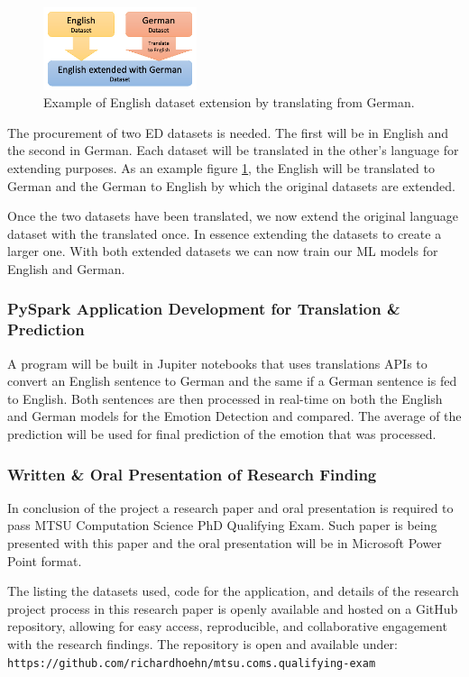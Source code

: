 \documentclass[11pt]{article}
\begin{document}
\begin{figure} %
    \centering
    \includegraphics[width=0.4\textwidth]{Dataset-Extension}
    \caption{Example of English dataset extension by translating from German.}
    \label{fig:dataset-extension}
\end{figure}

The procurement of two ED datasets is needed. The first will be in English and the second in German. Each dataset will be translated in the other’s language for extending purposes. As an example figure \ref{fig:dataset-extension}, the English will be translated to German and the German to English by which the original datasets are extended. 


Once the two datasets have been translated, we now extend the original language dataset with the translated once. In essence extending the datasets to create a larger one. With both extended datasets we can now train our ML models for English and German.

\subsubsection{PySpark Application Development for Translation \& Prediction}
A program will be built in Jupiter notebooks that uses translations APIs to convert an English sentence to German and the same if a German sentence is fed to English. Both sentences are then processed in real-time on both the English and German models for the Emotion Detection and compared. The average of the prediction will be used for final prediction of the emotion that was processed.

\subsubsection{Written \& Oral Presentation of Research Finding}
In conclusion of the project a research paper and oral presentation is required to pass MTSU Computation Science PhD Qualifying Exam. Such paper is being presented with this paper and the oral presentation will be in Microsoft Power Point format.

The listing the datasets used, code for the application, and details of the research project process in this research paper is openly available and hosted on a GitHub repository, allowing for easy access, reproducible, and collaborative engagement with the research findings. The repository is open and available under: \texttt{https://github.com/richardhoehn/mtsu.coms.qualifying-exam}\cite{Hoehn_Improving_Emotion_Detection_2023}
\end{document}
